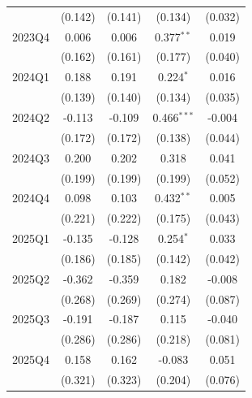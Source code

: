 \begin{table}[htbp]
\begin{tabular}{lcccc}
 & (0.142) & (0.141) & (0.134) & (0.032) \\
2023Q4 & 0.006 & 0.006 & 0.377$^{**}$ & 0.019 \\
 & (0.162) & (0.161) & (0.177) & (0.040) \\
2024Q1 & 0.188 & 0.191 & 0.224$^{*}$ & 0.016 \\
 & (0.139) & (0.140) & (0.134) & (0.035) \\
2024Q2 & -0.113 & -0.109 & 0.466$^{***}$ & -0.004 \\
 & (0.172) & (0.172) & (0.138) & (0.044) \\
2024Q3 & 0.200 & 0.202 & 0.318 & 0.041 \\
 & (0.199) & (0.199) & (0.199) & (0.052) \\
2024Q4 & 0.098 & 0.103 & 0.432$^{**}$ & 0.005 \\
 & (0.221) & (0.222) & (0.175) & (0.043) \\
2025Q1 & -0.135 & -0.128 & 0.254$^{*}$ & 0.033 \\
 & (0.186) & (0.185) & (0.142) & (0.042) \\
2025Q2 & -0.362 & -0.359 & 0.182 & -0.008 \\
 & (0.268) & (0.269) & (0.274) & (0.087) \\
2025Q3 & -0.191 & -0.187 & 0.115 & -0.040 \\
 & (0.286) & (0.286) & (0.218) & (0.081) \\
2025Q4 & 0.158 & 0.162 & -0.083 & 0.051 \\
 & (0.321) & (0.323) & (0.204) & (0.076) \\
\bottomrule
\end{tabular}
\par\vspace{2pt}{\footnotesize Reference quarter 2022Q3 omitted. Standard errors clustered on occupation in parentheses. * p<0.10, ** p<0.05, *** p<0.01.}
\end{table}
